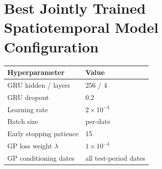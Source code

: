 \clearpage
\section{Best Jointly Trained Spatiotemporal Model Configuration}
\label{app:joint_hpo}

\begin{table}[htbp]
\centering
\begin{tabular}{ll}
\toprule
\textbf{Hyperparameter} & \textbf{Value} \\
\midrule
GRU hidden / layers     & 256 / 4 \\
GRU dropout             & 0.2 \\
Learning rate           & $2 \times 10^{-4}$ \\
Batch size              & per-date \\
Early stopping patience & 15 \\
GP loss weight $\lambda$  & $1 \times 10^{-4}$ \\
GP conditioning dates   & all test-period dates \\
\bottomrule
\end{tabular}
\end{table}
